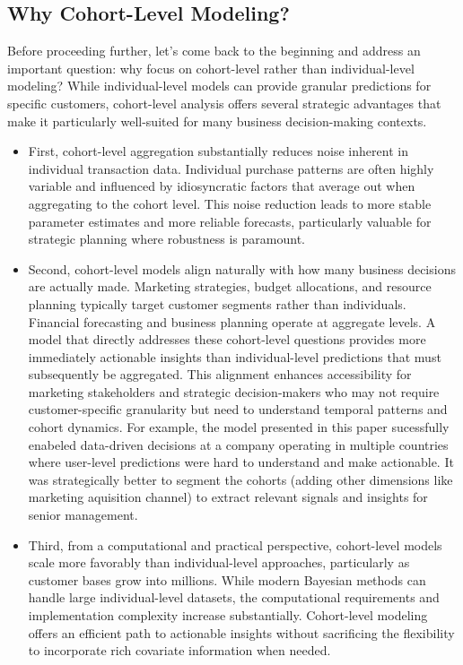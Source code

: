 \documentclass[11pt]{amsart}
\theoremstyle{definition}
\begin{document}
\subsection*{Why Cohort-Level Modeling?}

Before proceeding further, let's come back to the beginning and address an important question: why focus on cohort-level
rather than individual-level modeling? While individual-level models can provide granular predictions for specific customers,
cohort-level analysis offers several strategic advantages that make it particularly well-suited for many business
decision-making contexts.

\begin{itemize}

    \item First, cohort-level aggregation substantially reduces noise inherent in individual transaction data. Individual purchase
          patterns are often highly variable and influenced by idiosyncratic factors that average out when aggregating to the cohort
          level. This noise reduction leads to more stable parameter estimates and more reliable forecasts, particularly valuable for
          strategic planning where robustness is paramount.

    \item Second, cohort-level models align naturally with how many business decisions are actually made. Marketing strategies, budget
          allocations, and resource planning typically target customer segments rather than individuals. Financial forecasting and
          business planning operate at aggregate levels. A model that directly addresses these cohort-level questions provides more
          immediately actionable insights than individual-level predictions that must subsequently be aggregated. This alignment
          enhances accessibility for marketing stakeholders and strategic decision-makers who may not require customer-specific
          granularity but need to understand temporal patterns and cohort dynamics. For example, the model presented in this paper
          sucessfully enabeled data-driven decisions at a company operating in multiple countries where user-level predictions
          were hard to understand and make actionable. It was strategically better to segment the cohorts (adding other dimensions
          like marketing aquisition channel) to extract relevant signals and insights for senior management.

    \item Third, from a computational and practical perspective, cohort-level models scale more favorably than individual-level
          approaches, particularly as customer bases grow into millions. While modern Bayesian methods can handle large individual-level
          datasets, the computational requirements and implementation complexity increase substantially. Cohort-level modeling offers
          an efficient path to actionable insights without sacrificing the flexibility to incorporate rich covariate information when
          needed.

\end{itemize}
\end{document}
